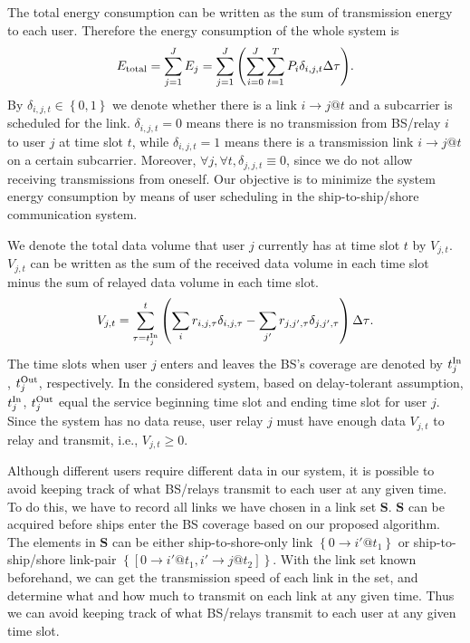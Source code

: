 \documentclass[conference]{IEEEtran}
\begin{document}
 The total energy consumption can be written as the sum of transmission energy to each user. 
 Therefore the energy consumption of the whole system is
 \begin{align}
  {{E_{\rm{total}}} = \sum\limits_{j = 1}^J {{E_j}} = \sum\limits_{j = 1}^J {\left( {\sum\limits_{i=0}^{J}{\sum\limits_{t = 1}^T {{P_{i}}\delta _{i,j,t}} } \Delta \tau  }\right)}}. 
  \end{align}
 By $\delta _{i,j,t} \in \left\{ {0,1} \right\}$ we denote whether there is a link $i \to j @ t$ and a subcarrier is scheduled for the link. $ {{\delta _{i,j,t}}} = 0$ means there is no transmission from BS/relay $i$ to user $j$ at time slot $t$, while $ {{\delta _{i,j,t}}} = 1$ means there is a transmission link $i \to j @ t$ on a certain subcarrier. Moreover, $\forall j,\forall t,{\delta _{j,j,t}} \equiv 0$, since we do not allow receiving transmissions from oneself. 
 Our objective is to minimize the system energy consumption by means of user scheduling in the ship-to-ship/shore communication system. 
 
 We denote the total data volume that user $j$ currently has at time slot $t$ by ${V_{j,t}}$. ${V_{j,t}}$ can be written as the sum of the received data volume in each time slot minus the sum of relayed data volume in each time slot. 
 \begin{align}
  {V_{j,t}} = \sum\limits_{\tau = t_j^{{\rm{In}}}}^t {\left( {\sum\limits_i {{r_{i,j,\tau }\delta _{i,j,\tau}}} - \sum\limits_{j'} {{r_{j,j',\tau }\delta _{j,j',\tau}}} } \right) \Delta \tau } .
 \end{align}
 The time slots when user $j$ enters and leaves the BS's coverage are denoted by $t_j^{{\rm{In}}}$, $t_j^{{\rm{Out}}}$, respectively. In the considered system, based on delay-tolerant assumption, $t_j^{{\rm{In}}}$, $t_j^{{\rm{Out}}}$ equal the service beginning time slot and ending time slot for user $j$. 
 Since the system has no data reuse, user relay $j$ must have enough data ${V_{j,t}}$ to relay and transmit, i.e., ${V_{j,t} \ge 0}$. 

 Although different users require different data in our system, it is possible to avoid keeping track of what BS/relays transmit to each user at any given time. To do this, we have to record all links we have chosen in a link set ${\mathbf{S}}$. ${\mathbf{S}}$ can be acquired before ships enter the BS coverage based on our proposed algorithm. The elements in ${\mathbf{S}}$ can be either ship-to-shore-only link $\left\{0 \to i'@{t_1}\right\}$ or ship-to-ship/shore link-pair $\left\{\left[ {0 \to i'@{t_1},i' \to j@{t_2}} \right]\right\}$. 
 With the link set known beforehand, we can get the transmission speed of each link in the set, and determine what and how much to transmit on each link at any given time. Thus we can avoid keeping track of what BS/relays transmit to each user at any given time slot. 
 
\end{document}
